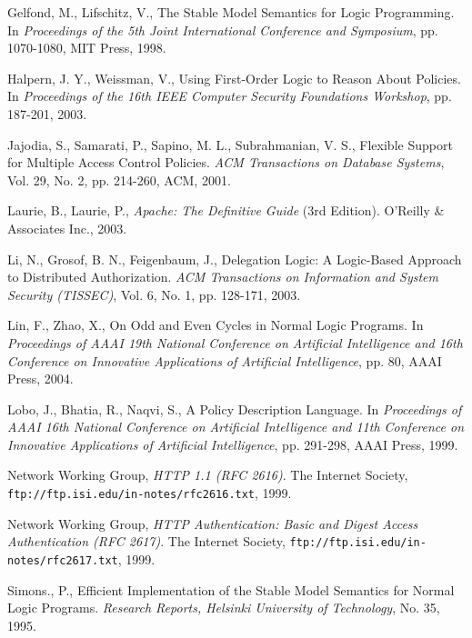 \documentclass[global,twocolumn,final]{svjour}
\begin{document}
\begin{thebibliography}{5}
      Gelfond, M., Lifschitz, V.,
      The Stable Model Semantics for Logic Programming.
      In {\em Proceedings of the 5th Joint International Conference and
      Symposium},
      pp. 1070-1080, MIT Press, 1998.

      Halpern, J. Y., Weissman, V.,
      Using First-Order Logic to Reason About Policies.
      In {\em Proceedings of the 16th IEEE Computer Security Foundations
      Workshop}, pp. 187-201, 2003.

      Jajodia, S., Samarati, P., Sapino, M. L., Subrahmanian, V. S.,
      Flexible Support for Multiple Access Control Policies.
      {\em ACM Transactions on Database Systems},
      Vol. 29, No. 2, pp. 214-260, ACM, 2001.

      Laurie, B., Laurie, P.,
      {\em Apache: The Definitive Guide} (3rd Edition).
      O'Reilly \& Associates Inc., 2003.

      Li, N., Grosof, B. N., Feigenbaum, J.,
      Delegation Logic: A Logic-Based Approach to Distributed Authorization.
      {\em ACM Transactions on Information and System Security (TISSEC)},
      Vol. 6, No. 1, pp. 128-171, 2003.

      Lin, F., Zhao, X.,
      On Odd and Even Cycles in Normal Logic Programs.
      In {\em Proceedings of AAAI 19th National Conference on Artificial
      Intelligence and 16th Conference on Innovative Applications of Artificial
      Intelligence},
      pp. 80, AAAI Press, 2004.

      Lobo, J., Bhatia, R., Naqvi, S.,
      A Policy Description Language.
      In {\em Proceedings of AAAI 16th National Conference on Artificial
      Intelligence and 11th Conference on Innovative Applications of Artificial
      Intelligence},
      pp. 291-298, AAAI Press, 1999.

      Network Working Group,
      {\em HTTP 1.1 (RFC 2616)}.
      The Internet Society,
      {\tt \scriptsize ftp://ftp.isi.edu/in-notes/rfc2616.txt},
      1999.

      Network Working Group,
      {\em HTTP Authentication: Basic and Digest Access Authentication (RFC 2617)}.
      The Internet Society,
      {\tt \scriptsize ftp://ftp.isi.edu/in-notes/rfc2617.txt},
      1999.

      Simons., P.,
      Efficient Implementation of the Stable Model Semantics for Normal Logic
      Programs.
      {\em Research Reports, Helsinki University of Technology},
      No. 35, 1995.
  \end{thebibliography}
\end{document}
